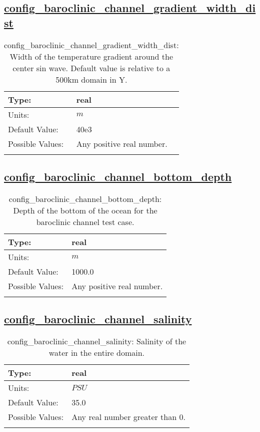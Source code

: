 \subsection[config\_baroclinic\_channel\_gradient\_width\_dist]{\hyperref[sec:nm_tab_baroclinic_channel]{config\_baroclinic\_channel\_gradient\_width\_dist}}
\label{subsec:nm_sec_config_baroclinic_channel_gradient_width_dist}
\begin{center}
\begin{longtable}{| p{2.0in} || p{4.0in} |}
    \hline
    Type: & real \\
    \hline
    Units: & $m$ \\
    \hline
    Default Value: & 40e3 \\
    \hline
    Possible Values: & Any positive real number. \\
    \hline
    \caption{config\_baroclinic\_channel\_gradient\_width\_dist: Width of the temperature gradient around the center sin wave. Default value is relative to a 500km domain in Y.}
\end{longtable}
\end{center}
\subsection[config\_baroclinic\_channel\_bottom\_depth]{\hyperref[sec:nm_tab_baroclinic_channel]{config\_baroclinic\_channel\_bottom\_depth}}
\label{subsec:nm_sec_config_baroclinic_channel_bottom_depth}
\begin{center}
\begin{longtable}{| p{2.0in} || p{4.0in} |}
    \hline
    Type: & real \\
    \hline
    Units: & $m$ \\
    \hline
    Default Value: & 1000.0 \\
    \hline
    Possible Values: & Any positive real number. \\
    \hline
    \caption{config\_baroclinic\_channel\_bottom\_depth: Depth of the bottom of the ocean for the baroclinic channel test case.}
\end{longtable}
\end{center}
\subsection[config\_baroclinic\_channel\_salinity]{\hyperref[sec:nm_tab_baroclinic_channel]{config\_baroclinic\_channel\_salinity}}
\label{subsec:nm_sec_config_baroclinic_channel_salinity}
\begin{center}
\begin{longtable}{| p{2.0in} || p{4.0in} |}
    \hline
    Type: & real \\
    \hline
    Units: & $PSU$ \\
    \hline
    Default Value: & 35.0 \\
    \hline
    Possible Values: & Any real number greater than 0. \\
    \hline
    \caption{config\_baroclinic\_channel\_salinity: Salinity of the water in the entire domain.}
\end{longtable}
\end{center}
